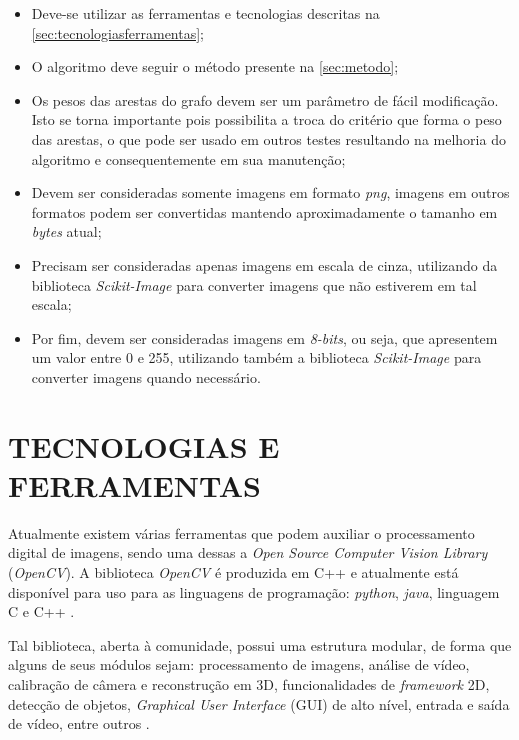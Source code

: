 \begin{itemize}
    \item Deve-se utilizar as ferramentas e tecnologias descritas na  \autoref{sec:tecnologiasferramentas};
    \item O algoritmo deve seguir o método presente na \autoref{sec:metodo};
    \item Os pesos das arestas do grafo devem ser um parâmetro de fácil modificação. Isto se torna importante pois possibilita a troca do critério que forma o peso das arestas, o que pode ser usado em outros testes resultando na melhoria do algoritmo e consequentemente em sua manutenção;
    \item Devem ser consideradas somente imagens em formato \textit{png}, imagens em outros formatos podem ser convertidas mantendo aproximadamente o tamanho em \textit{bytes} atual;
    \item Precisam ser consideradas apenas imagens em escala de cinza, utilizando da biblioteca \textit{Scikit-Image} \cite{ScikitImage} para converter imagens que não estiverem em tal escala;
    \item Por fim, devem ser consideradas imagens em \textit{8-bits}, ou seja, que apresentem um valor entre 0 e 255, utilizando também a biblioteca \textit{Scikit-Image} \cite{ScikitImage} para converter imagens quando necessário.
\end{itemize}

\section{TECNOLOGIAS E FERRAMENTAS}
\label{sec:tecnologiasferramentas}

\par Atualmente existem várias ferramentas que podem auxiliar o processamento digital de imagens, sendo uma dessas a \textit{Open Source Computer Vision Library} (\textit{OpenCV}).
A biblioteca \textit{OpenCV} é produzida em C++ e atualmente está disponível para uso para as linguagens de programação: \textit{python}, \textit{java}, linguagem C e C++ \cite{opencv_library}.

\par Tal biblioteca, aberta à comunidade, possui uma estrutura modular, de forma que alguns de seus módulos sejam: processamento de imagens, análise de vídeo, calibração de câmera e reconstrução em 3D, funcionalidades de \textit{framework} 2D, detecção de objetos, \textit{Graphical User Interface} (GUI) de alto nível, entrada e saída de vídeo, entre outros \cite{opencv_library}.

